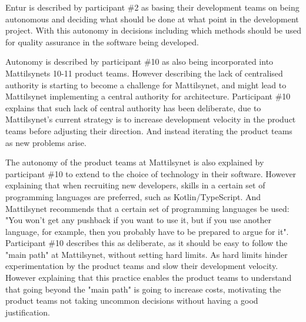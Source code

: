 
Entur is described by participant \#2 as basing their development teams on being autonomous and deciding what should be done at what point in the development project. With this autonomy in decisions including which methods should be used for quality assurance in the software being developed.


Autonomy is described by participant \#10 as also being incorporated into Mattilsynets 10-11 product teams. However describing the lack of centralised authority is starting to become a challenge for Mattilsynet, and might lead to Mattilsynet implementing a central authority for architecture. Participant \#10 explains that such lack of central authority has been deliberate, due to Mattilsynet's current strategy is to increase development velocity in the product teams before adjusting their direction. And instead iterating the product teams as new problems arise.


The autonomy of the product teams at Mattilsynet is also explained by participant \#10 to extend to the choice of technology in their software. However explaining that when recruiting new developers, skills in a certain set of programming languages are preferred, such as Kotlin/TypeScript. And Mattilsynet recommends that a certain set of programming languages be used: "You won't get any pushback if you want to use it, but if you use another language, for example, then you probably have to be prepared to argue for it". Participant \#10 describes this as deliberate, as it should be easy to follow the "main path" at Mattilsynet, without setting hard limits. As hard limits hinder experimentation by the product teams and slow their development velocity. However explaining that this practice enables the product teams to understand that going beyond the "main path" is going to increase costs, motivating the product teams not taking uncommon decisions without having a good justification.

